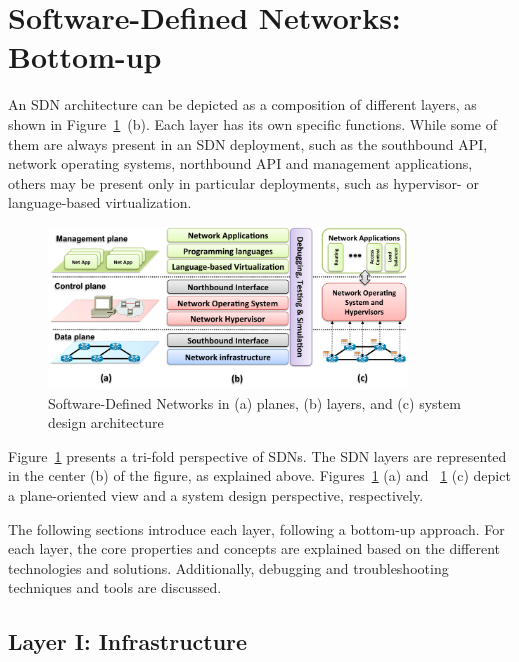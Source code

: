 \section{Software-Defined Networks: Bottom-up}
\label{sec:layeredapproach}

An SDN architecture can be depicted as a composition of different layers, 
as shown in Figure~\ref{fig:sdnlayers}~(b). Each layer has its own specific functions.
While some of them are always present in an SDN deployment, such as the southbound API, 
network operating systems, northbound API and management applications, others may be 
present only in particular deployments, such as hypervisor- or language-based virtualization.

\begin{figure}[ht!]
\centering
\includegraphics[width=0.85\textwidth]{figures/fig5_sdn_in_layers.pdf}
\caption{Software-Defined Networks in (a) planes, (b) layers, and (c) system design architecture}
\label{fig:sdnlayers}
\end{figure}

Figure~\ref{fig:sdnlayers} presents a tri-fold perspective of SDNs. The SDN layers are represented 
in the center (b) of the figure, as explained above. Figures~\ref{fig:sdnlayers} (a) and ~\ref{fig:sdnlayers} (c) depict
a plane-oriented view and a system design perspective, respectively.

The following sections introduce each layer, following a bottom-up approach. For each layer, the core properties and concepts are explained based on the different technologies and solutions.  Additionally, debugging and troubleshooting techniques and tools are discussed.

\subsection{Layer I: Infrastructure}
\label{sec:infrastructure}

